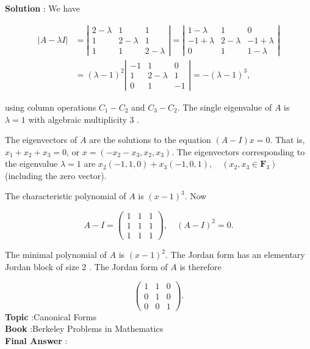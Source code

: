 \documentclass[10pt]{article}
\begin{document}
\textbf{Solution} : We have

$$
\begin{aligned}
|A-\lambda I| &=\left|\begin{array}{ccc}
2-\lambda & 1 & 1 \\
1 & 2-\lambda & 1 \\
1 & 1 & 2-\lambda
\end{array}\right|=\left|\begin{array}{ccc}
1-\lambda & 1 & 0 \\
-1+\lambda & 2-\lambda & -1+\lambda \\
0 & 1 & 1-\lambda
\end{array}\right| \\
&=(\lambda-1)^{2}\left|\begin{array}{ccc}
-1 & 1 & 0 \\
1 & 2-\lambda & 1 \\
0 & 1 & -1
\end{array}\right|=-(\lambda-1)^{3},
\end{aligned}
$$

using column operations $C_{1}-C_{2}$ and $C_{3}-C_{2}$. The single eigenvalue of $A$ is $\lambda=1$ with algebraic multiplicity 3 .

The eigenvectors of $A$ are the solutions to the equation $(A-I) x=0$. That is, $x_{1}+x_{2}+x_{3}=0$, or $x=\left(-x_{2}-x_{3}, x_{2}, x_{3}\right)$. The eigenvectors corresponding to the eigenvalue $\lambda=1$ are $x_{2}(-1,1,0)+x_{3}(-1,0,1), \quad\left(x_{2}, x_{3} \in \mathbf{F}_{3}\right)$ (including the zero vector).

The characteristic polynomial of $A$ is $(x-1)^{3}$. Now

$$
A-I=\left(\begin{array}{lll}
1 & 1 & 1 \\
1 & 1 & 1 \\
1 & 1 & 1
\end{array}\right), \quad(A-I)^{2}=0 .
$$

The minimal polynomial of $A$ is $(x-1)^{2}$. The Jordan form has an elementary Jordan block of size 2 . The Jordan form of $A$ is therefore

$$
\left(\begin{array}{lll}
1 & 1 & 0 \\
0 & 1 & 0 \\
0 & 0 & 1
\end{array}\right) .
$$
\textbf{Topic} :Canonical Forms \\
\textbf{Book} :Berkeley Problems in Mathematics\\
\textbf{Final Answer} :\\
\end{document}
